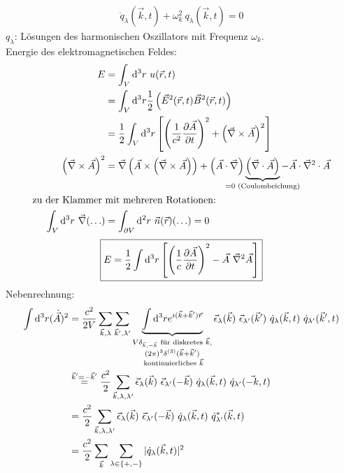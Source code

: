 		\begin{align*}
			\boxed{\ddot{q}_\lambda (\vec{k} , t) + \omega_k^2 ~q_\lambda (\vec{k} , t)} = 0
		\end{align*}
	$q_\lambda$: Lösungen des harmonischen Oszillators mit Frequenz $\omega_k$. \\
	Energie des elektromagnetischen Feldes: 
		\begin{align*}
			E &= \int_V \diff^3 r ~u (\vec{r} , t) \\
			&= \int_V \diff^3 r \frac{1}{2} \left( \vec{E}^2 (\vec{r} , t) \vec{B}^2 (\vec{r} , t)
			\right) \\
			&= \frac{1}{2} \int_V \diff^3 r \left[
				\left(\frac{1}{c^2} \frac{\partial \vec{A}}{\partial t}\right)^2
				+ \left( \vec{\nabla} \times \vec{A}\right)^2
			\right] \\
			\left( \vec{\nabla} \times \vec{A}\right)^2 &=
			\vec{\nabla} \left(\vec{A} \times \left( \vec{\nabla} \times \vec{A} \right)\right)
			+ \left(\vec{A} \cdot \vec{\nabla}\right) 
			\underbrace{\left( \vec{\nabla} \cdot \vec{A}\right)}_{\mathclap{=0 \text{~(Coulombeichung)}}}
			- \vec{A} \cdot \vec{\nabla}^2 \cdot \vec{A} \\
			\text{zu der Klammer~} &\text{mit mehreren Rotationen:~} \\
			\int_V \diff^3 r~ \vec{\nabla} (\ldots) 
			&= \int_{\partial V} \diff^2 r~ \vec{n} (\vec{r}) (\ldots) = 0
		\end{align*}
		\begin{align*}
			\boxed{
				E = \frac{1}{2} \int \mathrm{d}^3 r \left[ 
				\left(\frac{1}{c} \frac{\partial \vec{A}}{\partial t}\right)^2
				- \vec{A}~ \vec{\nabla}^2 \vec{A}
				\right]	
			}
		\end{align*}
	Nebenrechnung:
		\begin{align*}
			\int \mathrm{d}^3 r (\dot{\vec{A}})^2 &= 
			\frac{c^2}{2 V} \sum_{\vec{k}, \lambda} \sum_{\vec{k}', \lambda'}
			\underbrace{\int \mathrm{d}^3 r e^{i (\vec{k} + \vec{k}') \vec{r}}}_{
				\substack{V \delta_{\vec{k}, -\vec{k}} 
					\text{~für diskretes~} \vec{k},\\ 
					(2 \pi)^3 \delta^{(3)} (\vec{k} + \vec{k}') \\ 
					\text{~kontinuierliches~} \vec{k}}
				}
			\vec{\epsilon}_\lambda(\vec{k}) ~\vec{\epsilon}_{\lambda'} (\vec{k}')
			~\dot{q}_\lambda (\vec{k} , t) ~\dot{q}_{\lambda'} (\vec{k}' , t) 
			\\
			&\overset{\vec{k}' = -\vec{k}'}{=} 
			\frac{c^2}{2} \sum_{\vec{k}, \lambda, \lambda'}
			\vec{\epsilon}_\lambda (\vec{k}) ~\vec{\epsilon}_{\lambda'}(-\vec{k})~
			\dot{q}_\lambda (\vec{k} , t) ~\dot{q}_{\lambda'} (\vec{-k} , t)
			\\
			&= \frac{c^2}{2} \sum_{\vec{k}, \lambda, \lambda'}
			\vec{\epsilon}_\lambda (\vec{k}) ~\vec{\epsilon}_{\lambda'}(-\vec{k})~
			\dot{q}_\lambda (\vec{k} , t) ~\dot{q}^*_{\lambda'} (\vec{k} , t)
			\\
			&= \frac{c^2}{2} \sum_{\vec{k}} \sum_{\lambda \in \{+ , - \} }
			| \dot{q}_\lambda(\vec{k} , t)  |^2
		\end{align*}
